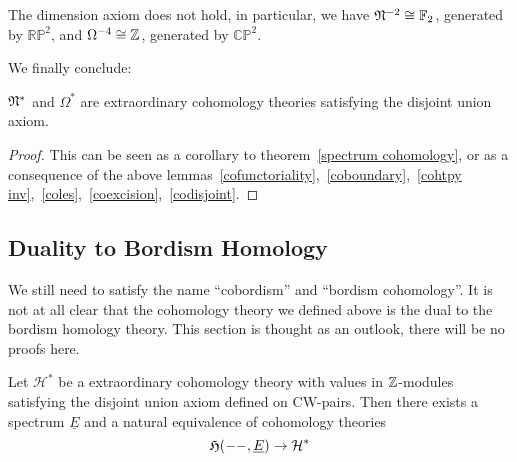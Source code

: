 \documentclass[a4paper,11pt]{article}
\begin{document}
\begin{remark}\cite{thom}
    The dimension axiom does not hold, in particular, we have \(\mathfrak{N}^{-2}\cong\mathbb{F}_2\), generated by \(\mathbb{RP}^2\), and \(\Omega^{-4}\cong\mathbb{Z}\), generated by \(\mathbb{CP}^2\).
\end{remark}


We finally conclude:
\begin{theorem}
    \(\mathfrak{N}^\ast\) and \(\Omega^\ast\) are extraordinary cohomology theories satisfying the disjoint union axiom.
\end{theorem}

\begin{proof}
    This can be seen as a corollary to theorem\ \ref{spectrum cohomology}, or as a consequence of the above lemmas\ \ref{cofunctoriality},\ \ref{coboundary},\ \ref{cohtpy inv},\ \ref{coles},\ \ref{coexcision},\ \ref{codisjoint}.
\end{proof}

\subsection{Duality to Bordism Homology}\label{Kap Duality}

We still need to satisfy the name \enquote{cobordism} and \enquote{bordism cohomology}. It is not at all clear that the cohomology theory we defined above is the dual to the bordism homology theory. This section is thought as an outlook, there will be no proofs here.

\begin{theorem}%
    Let \(\mathcal{H}^\ast\) be a extraordinary cohomology theory with values in \(\mathbb{Z}\)-modules satisfying the disjoint union axiom defined on CW-pairs. Then there exists a spectrum \(\underline E\) and a natural equivalence of cohomology theories
    \[\mathfrak{H}(--,\underline{E})\to\mathcal{H}^\ast\]
\end{theorem}

\end{document}
